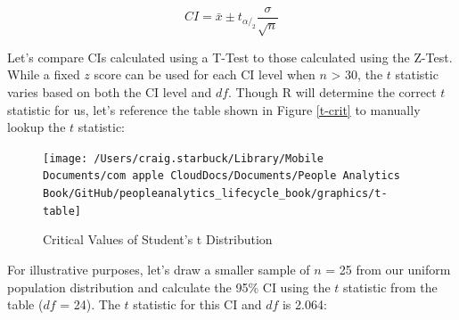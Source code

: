 \documentclass[]{book}
\newenvironment{Shaded}{\begin{snugshade}}{\end{snugshade}}
\newcommand{\CommentTok}[1]{\textcolor[rgb]{0.56,0.35,0.01}{\textit{#1}}}
\newcommand{\DataTypeTok}[1]{\textcolor[rgb]{0.13,0.29,0.53}{#1}}
\newcommand{\DecValTok}[1]{\textcolor[rgb]{0.00,0.00,0.81}{#1}}
\newcommand{\FloatTok}[1]{\textcolor[rgb]{0.00,0.00,0.81}{#1}}
\newcommand{\KeywordTok}[1]{\textcolor[rgb]{0.13,0.29,0.53}{\textbf{#1}}}
\newcommand{\NormalTok}[1]{#1}
\newcommand{\OperatorTok}[1]{\textcolor[rgb]{0.81,0.36,0.00}{\textbf{#1}}}
\newcommand{\OtherTok}[1]{\textcolor[rgb]{0.56,0.35,0.01}{#1}}
\newcommand{\StringTok}[1]{\textcolor[rgb]{0.31,0.60,0.02}{#1}}
\begin{document}
\[ CI = \bar{x} \pm t_{\alpha/_2} \frac{\sigma}{\sqrt{n}} \]

Let's compare CIs calculated using a T-Test to those calculated using the Z-Test. While a fixed \(z\) score can be used for each CI level when \(n\) \textgreater{} 30, the \(t\) statistic varies based on both the CI level and \(df\). Though R will determine the correct \(t\) statistic for us, let's reference the table shown in Figure \ref{t-crit} to manually lookup the \(t\) statistic:

\begin{figure}

{\centering \texttt{[image: /Users/craig.starbuck/Library/Mobile Documents/com~apple~CloudDocs/Documents/People Analytics Book/GitHub/peopleanalytics\_lifecycle\_book/graphics/t-table]} 

}

\caption{Critical Values of Student's t Distribution}\label{fig:t-crit}
\end{figure}

For illustrative purposes, let's draw a smaller sample of \(n\) = 25 from our uniform population distribution and calculate the 95\% CI using the \(t\) statistic from the table (\(df\) = 24). The \(t\) statistic for this CI and \(df\) is 2.064:

\begin{Shaded}
\end{Shaded}
\end{document}
